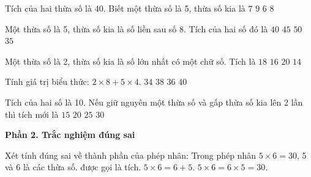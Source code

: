 \begin{ex} %
Tích của hai thừa số là 40. Biết một thừa số là 5, thừa số kia là
\choice
{$7$}
{$9$}
{$6$}
{\True $8$}
\end{ex}

\begin{ex} %
Một thừa số là 5, thừa số kia là số liền sau số 8. Tích của hai số đó là
\choice
{$40$}
{\True $45$}
{$50$}
{$35$}
\end{ex}

\begin{ex} %
Một thừa số là 2, thừa số kia là số lớn nhất có một chữ số. Tích là
\choice
{\True $18$}
{$16$}
{$20$}
{$14$}
\end{ex}

\begin{ex} %
Tính giá trị biểu thức: $2 \times 8 + 5 \times 4$.
\choice
{$34$}
{$38$}
{\True $36$}
{$40$}
\end{ex}

\begin{ex} %
Tích của hai số là 10. Nếu giữ nguyên một thừa số và gấp thừa số kia lên 2 lần thì tích mới là
\choice
{$15$}
{\True $20$}
{$25$}
{$30$}
\end{ex}

\textbf{Phần 2. Trắc nghiệm đúng sai}

\begin{ex} %
Xét tính đúng sai về thành phần của phép nhân:
\choiceTF
{\True Trong phép nhân $5 \times 6 = 30$, 5 và 6 là các thừa số.}
{ được gọi là tích.}
{$5 \times 6 = 6 + 5$.}
{\True $5 \times 6 = 6 \times 5 = 30$.}
\end{ex}

